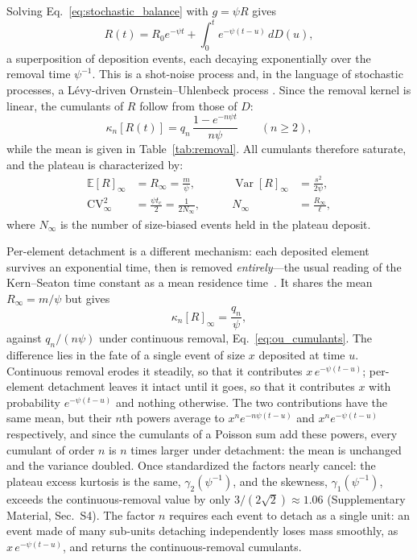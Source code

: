 \documentclass[preprint,12pt]{elsarticle}
\begin{document}
Solving Eq.~\eqref{eq:stochastic_balance} with $g=\psi R$
gives
\begin{equation}
  R(t)=R_0e^{-\psi t}+\int_0^t e^{-\psi(t-u)}\,dD(u),
  \label{eq:ou_solution}
\end{equation}
a superposition of deposition events, each decaying exponentially over the
removal time $\psi^{-1}$. This is a shot-noise process and, in the language of
stochastic processes, a L\'evy-driven Ornstein--Uhlenbeck process
\cite{Sato1999,BarndorffNielsenShephard2001}.
Since the removal kernel is
linear, the cumulants of $R$ follow from those of $D$:
\begin{equation}
  \kappa_n[R(t)]=q_n\,\frac{1-e^{-n\psi t}}{n\psi}\qquad(n\ge2),
  \label{eq:ou_cumulants}
\end{equation}
while the mean is given in Table~\ref{tab:removal}. All cumulants therefore
saturate, and the plateau is characterized by:
\begin{equation}
\begin{aligned}
  \mathbb E[R]_\infty&=R_\infty=\frac m\psi, &\qquad
  \operatorname{Var}[R]_\infty&=\frac{s^2}{2\psi},\\[2pt]
  \mathrm{CV}_\infty^2&=\frac{\psi t_c}{2}=\frac1{2N_\infty}, &\qquad
  N_\infty&=\frac{R_\infty}{\ell},
\end{aligned}
\label{eq:plateau}
\end{equation}
where $N_\infty$ is the number of size-biased events held in the plateau
deposit.

Per-element detachment is a different mechanism: each deposited element
survives an exponential time, then is removed \emph{entirely}---the usual
reading of the Kern--Seaton time constant as a mean residence
time~\cite{Shaikh2023}. It shares the mean $R_\infty=m/\psi$ but gives
\begin{equation}
  \kappa_n[R]_\infty=\frac{q_n}{\psi},
  \label{eq:mginf_cumulants}
\end{equation}
against $q_n/(n\psi)$ under continuous removal,
Eq.~\eqref{eq:ou_cumulants}. The difference lies in the fate of a single
event of size $x$ deposited at time $u$. Continuous removal erodes it
steadily, so that it contributes $x\,e^{-\psi(t-u)}$; per-element detachment
leaves it intact until it goes, so that it contributes $x$ with probability
$e^{-\psi(t-u)}$ and nothing otherwise. The two contributions have the same
mean, but their $n$th powers average to $x^ne^{-n\psi(t-u)}$ and
$x^ne^{-\psi(t-u)}$ respectively, and since the cumulants of a Poisson sum
add these powers, every cumulant of order $n$ is $n$ times larger under
detachment: the mean is unchanged and the variance doubled. Once standardized
the factors nearly cancel: the plateau excess kurtosis is the same,
$\gamma_2(\psi^{-1})$, and the skewness, $\gamma_1(\psi^{-1})$, exceeds the
continuous-removal value by only $3/(2\sqrt2)\approx1.06$ (Supplementary
Material, Sec.~S4). The factor $n$ requires each event to detach as
a single unit: an event made of many sub-units detaching independently loses
mass smoothly, as $x\,e^{-\psi(t-u)}$, and returns the continuous-removal
cumulants.
\end{document}
